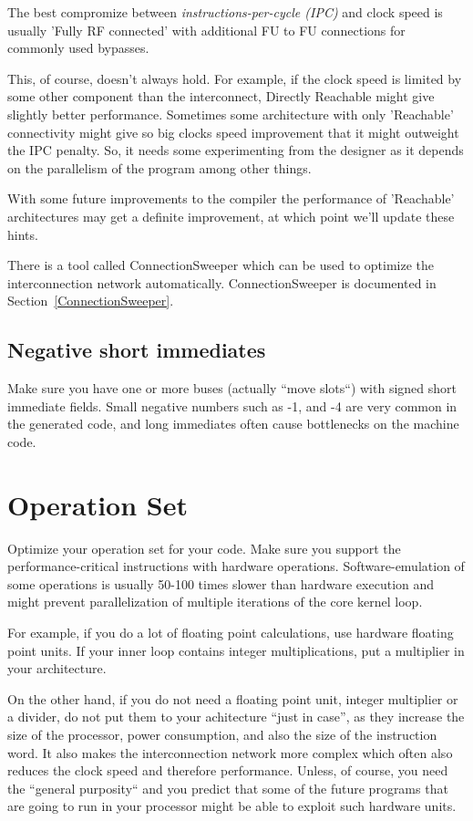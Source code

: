 \documentclass[a4paper,twoside]{tceusermanual}
\begin{document}
The best compromize between \textit{instructions-per-cycle (IPC)} and clock speed 
is usually 'Fully RF connected' with additional FU to FU connections for commonly 
used bypasses.

This, of course, doesn't always hold. For example, if the clock speed is limited by some
other component than the interconnect, Directly Reachable might give
slightly better performance. Sometimes some architecture with only 
'Reachable' connectivity might give so big clocks speed improvement that
it might outweight the IPC penalty. So, it needs some experimenting from
the designer as it depends on the parallelism of the program among other things.

With some future improvements to the compiler the performance of 'Reachable'
architectures may get a definite improvement, at which point we'll update these
hints.

There is a tool called ConnectionSweeper which can be used to optimize the
interconnection network automatically. ConnectionSweeper is documented in 
Section~\ref{ConnectionSweeper}.

\subsection{Negative short immediates}

Make sure you have one or more buses (actually ``move slots``) with signed short 
immediate fields. Small negative numbers such as -1, and -4 are very common in 
the generated code, and long immediates often cause bottlenecks on the machine code.

\section{Operation Set}

Optimize your operation set for your code. Make sure you support the 
performance-critical instructions with hardware operations. Software-emulation of 
some operations is usually 50-100 times slower than hardware execution and
might prevent parallelization of multiple iterations of the core kernel loop.

For example, if you do a lot of floating point calculations, use hardware floating 
point units. If your inner loop contains integer multiplications, put a multiplier in 
your architecture.

On the other hand, if you do not need a floating point unit, integer multiplier or 
a divider, do not put them to your achitecture ``just in case'', as they increase 
the size of the processor, power consumption, and also the size of the instruction 
word. It also makes the interconnection network more complex which often also 
reduces the clock speed and therefore performance. Unless, of course, you need
the ``general purposity`` and you predict that some of the future programs that 
are going to run in your processor might be able to exploit such hardware units.
\end{document}
